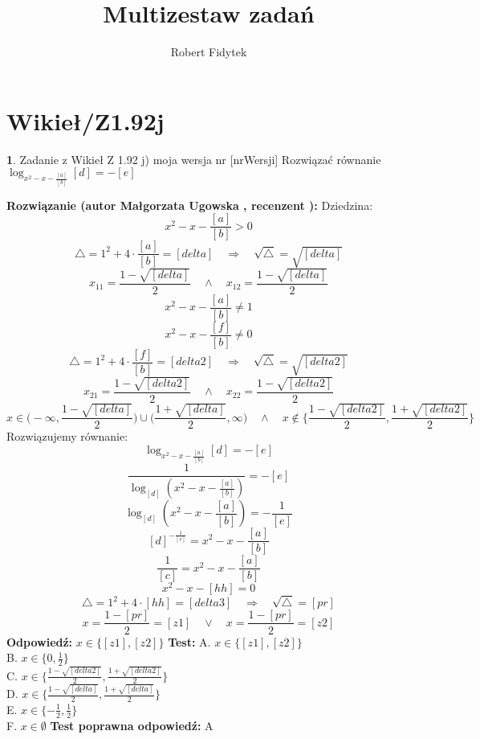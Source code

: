 \documentclass[12pt, a4paper]{article}
\title{Multizestaw zadań}
\author{Robert Fidytek}
\date{}
\theoremstyle{definition} %
\newtheorem{zad}{}
\newcommand{\kategoria}[1]{\section{#1}} %
\newcommand{\zadStart}[1]{\begin{zad}#1\newline} %
\newcommand{\zadStop}{\end{zad}}   %
\newcommand{\rozwStart}[2]{\noindent \textbf{Rozwiązanie (autor #1 , recenzent #2): }\newline} %
\newcommand{\rozwStop}{\newline}                                            %
\newcommand{\odpStart}{\noindent \textbf{Odpowiedź:}\newline}    %
\newcommand{\odpStop}{\newline}                                             %
\newcommand{\testStart}{\noindent \textbf{Test:}\newline} %
\newcommand{\testStop}{\newline} %
\newcommand{\kluczStart}{\noindent \textbf{Test poprawna odpowiedź:}\newline} %
\newcommand{\kluczStop}{\newline} %
\begin{document}
\maketitle


\kategoria{Wikieł/Z1.92j}
\zadStart{Zadanie z Wikieł Z 1.92 j) moja wersja nr [nrWersji]}
Rozwiązać równanie $\log_{x^2-x-\frac{[a]}{[b]}}{[d]}=-[e]$
\zadStop
\rozwStart{Małgorzata Ugowska}{}
Dziedzina:
$$x^2-x-\frac{[a]}{[b]}>0$$
$$ \bigtriangleup = 1^2 + 4 \cdot \frac{[a]}{[b]} = [delta] \quad  \Longrightarrow \quad \sqrt{\bigtriangleup} = \sqrt{[delta]}$$
$$x_{11}=\frac{1-\sqrt{[delta]}}{2} \quad \land \quad x_{12}=\frac{1-\sqrt{[delta]}}{2} $$
$$x^2-x-\frac{[a]}{[b]} \ne 1$$
$$x^2-x-\frac{[f]}{[b]} \ne 0$$
$$ \bigtriangleup = 1^2 + 4 \cdot \frac{[f]}{[b]} = [delta2] \quad  \Longrightarrow \quad \sqrt{\bigtriangleup} = \sqrt{[delta2]}$$
$$x_{21}=\frac{1-\sqrt{[delta2]}}{2} \quad \land \quad x_{22}=\frac{1-\sqrt{[delta2]}}{2} $$
$$x \in \Big(-\infty, \frac{1-\sqrt{[delta]}}{2}\Big) \cup \Big(\frac{1+\sqrt{[delta]}}{2}, \infty \Big) \quad \land \quad x \notin \Big\{\frac{1-\sqrt{[delta2]}}{2}, \frac{1+\sqrt{[delta2]}}{2} \Big\} $$
Rozwiązujemy równanie:
$$\log_{x^2-x-\frac{[a]}{[b]}}{[d]}=-[e]$$
$$\frac{1}{\log_{[d]}{(x^2-x-\frac{[a]}{[b]})}}=-[e]$$
$$\log_{[d]}{(x^2-x-\frac{[a]}{[b]})}=-\frac{1}{[e]}$$
$$[d]^{-\frac{1}{[e]}} = x^2-x-\frac{[a]}{[b]}$$
$$\frac{1}{[c]} = x^2-x-\frac{[a]}{[b]}$$
$$x^2-x-[hh] = 0$$
$$ \bigtriangleup = 1^2 + 4 \cdot [hh] = [delta3] \quad  \Longrightarrow \quad \sqrt{\bigtriangleup} = [pr]$$
$$x =\frac{1-[pr]}{2} = [z1] \quad \vee \quad x =\frac{1-[pr]}{2} =[z2]$$
\rozwStop
\odpStart
$x \in \{ [z1], [z2] \}$
\odpStop
\testStart
A. $x \in \{ [z1], [z2] \}$\\
B. $x \in \{ 0, \frac{1}{2} \}$\\
C. $x \in \Big\{\frac{1-\sqrt{[delta2]}}{2}, \frac{1+\sqrt{[delta2]}}{2} \Big\}$\\
D. $ x \in \Big\{\frac{1-\sqrt{[delta]}}{2}, \frac{1+\sqrt{[delta]}}{2} \Big\} $ \\
E. $x \in \{ -\frac{1}{2}, \frac{1}{2} \}$\\
F. $x \in \emptyset $
\testStop
\kluczStart
A
\kluczStop
\end{document}
